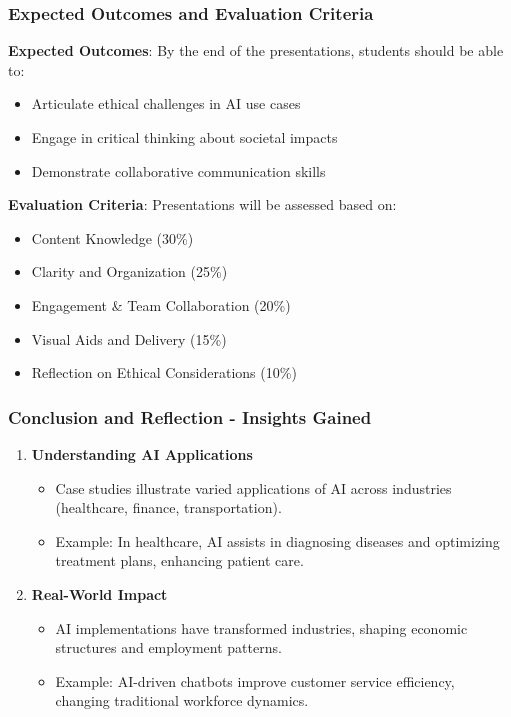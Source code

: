 \documentclass[aspectratio=169]{beamer}
\begin{document}
\begin{frame}[fragile]
    \frametitle{Expected Outcomes and Evaluation Criteria}
    \textbf{Expected Outcomes}:
    By the end of the presentations, students should be able to:
    \begin{itemize}
        \item Articulate ethical challenges in AI use cases
        \item Engage in critical thinking about societal impacts
        \item Demonstrate collaborative communication skills
    \end{itemize}

    \textbf{Evaluation Criteria}:
    Presentations will be assessed based on:
    \begin{itemize}
        \item Content Knowledge (30\%)
        \item Clarity and Organization (25\%)
        \item Engagement \& Team Collaboration (20\%)
        \item Visual Aids and Delivery (15\%)
        \item Reflection on Ethical Considerations (10\%)
    \end{itemize}
\end{frame}

\begin{frame}[fragile]
    \frametitle{Conclusion and Reflection - Insights Gained}
    \begin{enumerate}
        \item \textbf{Understanding AI Applications} 
            \begin{itemize}
                \item Case studies illustrate varied applications of AI across industries (healthcare, finance, transportation).
                \item Example: In healthcare, AI assists in diagnosing diseases and optimizing treatment plans, enhancing patient care.
            \end{itemize}
        \item \textbf{Real-World Impact} 
            \begin{itemize}
                \item AI implementations have transformed industries, shaping economic structures and employment patterns.
                \item Example: AI-driven chatbots improve customer service efficiency, changing traditional workforce dynamics.
            \end{itemize}
    \end{enumerate}
\end{frame}
\end{document}
